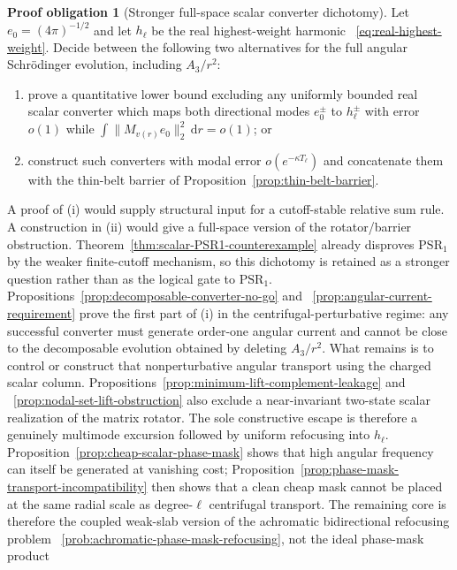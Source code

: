 \documentclass[11pt]{article}
\newcommand{\dd}{\,\mathrm d}
\theoremstyle{definition}
\newtheorem{problem}[theorem]{Proof obligation}
\theoremstyle{remark}
\begin{document}
\begin{problem}[Stronger full-space scalar converter dichotomy]
\label{prob:scalar-converter-dichotomy}
Let $e_0=(4\pi)^{-1/2}$ and let $h_\ell$ be the real highest-weight harmonic
~\eqref{eq:real-highest-weight}.  Decide between the following two alternatives
for the full angular Schr\"odinger evolution, including $A_3/r^2$:
\begin{enumerate}[label=(\roman*)]
 \item prove a quantitative lower bound excluding any uniformly bounded real
 scalar converter which maps both directional modes $e_0^\pm$ to
 $h_\ell^\pm$ with error $o(1)$ while
 $\int\|M_{v(r)}e_0\|_2^2\dd r=o(1)$; or
 \item construct such converters with modal error
 $o(e^{-\kappa T_\ell})$ and concatenate them with the thin-belt barrier of
 Proposition~\ref{prop:thin-belt-barrier}.
\end{enumerate}
A proof of (i) would supply structural input for a cutoff-stable relative sum
rule.  A construction in (ii) would give a full-space version of the
rotator/barrier obstruction.  Theorem~\ref{thm:scalar-PSR1-counterexample}
already disproves $\mathrm{PSR}_1$ by the weaker finite-cutoff mechanism, so
this dichotomy is retained as a stronger question rather than as the logical
gate to $\mathrm{PSR}_1$.
Propositions~\ref{prop:decomposable-converter-no-go} and
~\ref{prop:angular-current-requirement} prove the first part of (i) in the
centrifugal-perturbative regime: any successful converter must generate
order-one angular current and cannot be close to the decomposable evolution
obtained by deleting $A_3/r^2$.  What remains is to control or construct that
nonperturbative angular transport using the charged scalar column.
Propositions~\ref{prop:minimum-lift-complement-leakage} and
~\ref{prop:nodal-set-lift-obstruction} also exclude a near-invariant
 two-state scalar realization of the matrix rotator.  The sole constructive
 escape is therefore a genuinely multimode excursion followed by uniform
 refocusing into $h_\ell$.  Proposition~\ref{prop:cheap-scalar-phase-mask}
 shows that high angular frequency can itself be generated at vanishing cost;
 Proposition~\ref{prop:phase-mask-transport-incompatibility} then shows that a
 clean cheap mask cannot be placed at the same radial scale as degree-$\ell$
 centrifugal transport.  The remaining core is therefore the coupled
 weak-slab version of the achromatic bidirectional refocusing problem
 ~\ref{prob:achromatic-phase-mask-refocusing}, not the ideal phase-mask product

\end{problem}
\end{document}
